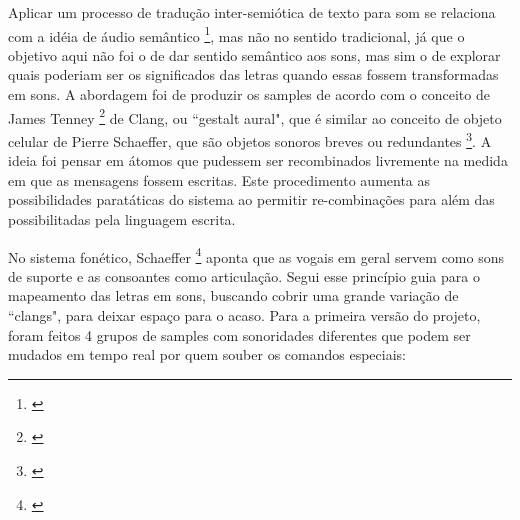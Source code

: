 Aplicar um processo de tradução inter-semiótica de texto para som se relaciona com a idéia de áudio semântico \footnote{\cite{Kostek:2010}}, mas não no sentido tradicional, já que o objetivo aqui não foi o de dar sentido semântico aos sons, mas sim o de explorar quais poderiam ser os significados das letras quando essas fossem transformadas em sons. A abordagem foi de produzir os samples de acordo com o conceito de James Tenney \footnote{\cite{Tenney1988}} de Clang, ou ``gestalt aural", que é similar ao conceito de objeto celular de Pierre Schaeffer, que são objetos sonoros breves ou redundantes \footnote{\cite{Chion1983}}. A ideia foi pensar em átomos que pudessem ser recombinados livremente na medida em que as mensagens fossem escritas. Este procedimento aumenta as possibilidades paratáticas do sistema ao permitir re-combinações para além das possibilitadas pela linguagem escrita.


No sistema fonético, Schaeffer \footnote{\cite{Schaeffer2007}} aponta que as vogais em geral servem como sons de suporte e as consoantes como articulação. Segui esse princípio guia para o mapeamento das letras em sons, buscando cobrir uma grande variação de ``clangs", para deixar espaço para o acaso. Para a primeira versão do projeto, foram feitos 4 grupos de samples com sonoridades diferentes que podem ser mudados em tempo real por quem souber os comandos especiais: 

